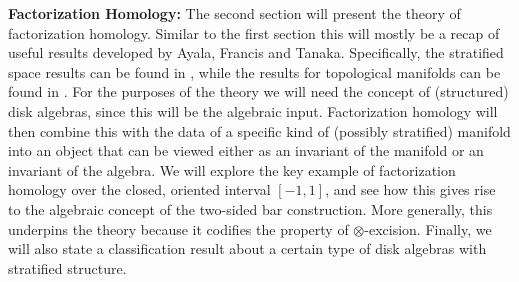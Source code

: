 \documentclass[../text]{subfiles}
\begin{document}
\textbf{ Factorization Homology:} The second section will present the theory of factorization homology. Similar to the first section this will mostly be a recap of useful results developed by Ayala, Francis and Tanaka. Specifically, the stratified space results can be found in \cite{aft_fhstrat}, while the results for topological manifolds can be found in \cite{af_fhtop}. For the purposes of the theory we will need the concept of (structured) disk algebras, since this will be the algebraic input. Factorization homology will then combine this with the data of a specific kind of (possibly stratified) manifold into an object that can be viewed either as an invariant of the manifold or an invariant of the algebra. We will explore the key example of factorization homology over the closed, oriented interval $[-1,1]$, and see how this gives rise to the algebraic concept of the two-sided bar construction. More generally, this underpins the theory because it codifies the property of $\otimes$-excision. Finally, we will also state a classification result \cite[prop.4.8]{aft_fhstrat} about a certain type of disk algebras with stratified structure.
\end{document}
